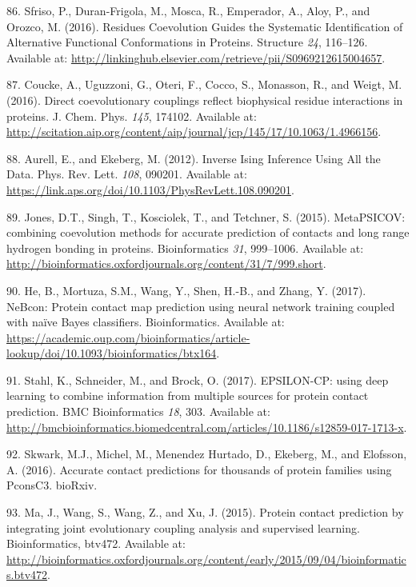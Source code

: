 \documentclass[12pt,a4paper,twoside]{book}
\theoremstyle{definition}
\theoremstyle{definition}
\theoremstyle{remark}
\begin{document}
\hypertarget{ref-Sfriso2016}{}
86. Sfriso, P., Duran-Frigola, M., Mosca, R., Emperador, A., Aloy, P.,
and Orozco, M. (2016). Residues Coevolution Guides the Systematic
Identification of Alternative Functional Conformations in Proteins.
Structure \emph{24}, 116--126. Available at:
\url{http://linkinghub.elsevier.com/retrieve/pii/S0969212615004657}.

\hypertarget{ref-Coucke2016}{}
87. Coucke, A., Uguzzoni, G., Oteri, F., Cocco, S., Monasson, R., and
Weigt, M. (2016). Direct coevolutionary couplings reflect biophysical
residue interactions in proteins. J. Chem. Phys. \emph{145}, 174102.
Available at:
\url{http://scitation.aip.org/content/aip/journal/jcp/145/17/10.1063/1.4966156}.

\hypertarget{ref-Aurell2012}{}
88. Aurell, E., and Ekeberg, M. (2012). Inverse Ising Inference Using
All the Data. Phys. Rev. Lett. \emph{108}, 090201. Available at:
\url{https://link.aps.org/doi/10.1103/PhysRevLett.108.090201}.

\hypertarget{ref-Jones2015a}{}
89. Jones, D.T., Singh, T., Kosciolek, T., and Tetchner, S. (2015).
MetaPSICOV: combining coevolution methods for accurate prediction of
contacts and long range hydrogen bonding in proteins. Bioinformatics
\emph{31}, 999--1006. Available at:
\url{http://bioinformatics.oxfordjournals.org/content/31/7/999.short}.

\hypertarget{ref-He2017}{}
90. He, B., Mortuza, S.M., Wang, Y., Shen, H.-B., and Zhang, Y. (2017).
NeBcon: Protein contact map prediction using neural network training
coupled with naïve Bayes classifiers. Bioinformatics. Available at:
\url{https://academic.oup.com/bioinformatics/article-lookup/doi/10.1093/bioinformatics/btx164}.

\hypertarget{ref-Stahl2017}{}
91. Stahl, K., Schneider, M., and Brock, O. (2017). EPSILON-CP: using
deep learning to combine information from multiple sources for protein
contact prediction. BMC Bioinformatics \emph{18}, 303. Available at:
\url{http://bmcbioinformatics.biomedcentral.com/articles/10.1186/s12859-017-1713-x}.

\hypertarget{ref-Skwark2016}{}
92. Skwark, M.J., Michel, M., Menendez Hurtado, D., Ekeberg, M., and
Elofsson, A. (2016). Accurate contact predictions for thousands of
protein families using PconsC3. bioRxiv.

\hypertarget{ref-Ma2015a}{}
93. Ma, J., Wang, S., Wang, Z., and Xu, J. (2015). Protein contact
prediction by integrating joint evolutionary coupling analysis and
supervised learning. Bioinformatics, btv472. Available at:
\url{http://bioinformatics.oxfordjournals.org/content/early/2015/09/04/bioinformatics.btv472}.
\end{document}
